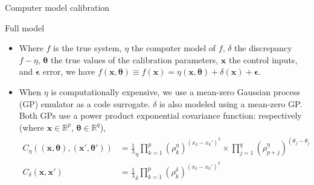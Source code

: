 \documentclass[final]{beamer}
\newlength{\onecolwid}
\begin{document}
\begin{frame}[t]
\begin{columns}[t]
\begin{column}{\onecolwid}
\begin{alertblock}{Computer model calibration}
\begin{itemize}
\end{itemize}

\end{alertblock}


\begin{alertblock}{Full model}

\begin{itemize}

\item Where $f$ is the true system, $\eta$ the computer model of $f$, $\delta$ the discrepancy $f-\eta$, $\boldsymbol \theta$ the true values of the calibration parameters, $\mathbf x$ the control inputs, and $\boldsymbol \epsilon$ error, we have $f(\mathbf x,\boldsymbol \theta) \equiv f(\mathbf x) = \eta(\mathbf x,\boldsymbol \theta) + \delta(\mathbf x) + \boldsymbol \epsilon$.
%
\item When $\eta$ is computationally expensive, we use a mean-zero Gaussian process (GP) emulator as a code surrogate.
%
%
$\delta$ is also modeled using a mean-zero GP. Both GPs use a power product exponential covariance function: respectively (where $\mathbf x\in\mathbb R^p$, $\boldsymbol\theta\in\mathbb R^q$),
\vspace{-3mm}
\begin{align*}
C_\eta(\!(\mathbf x,\!\boldsymbol\theta),\!(\mathbf x'\!,\!\boldsymbol\theta')\!)\! &= \frac1\lambda_\eta \prod_{k=1}^{p}\left(\rho^\eta_k\right)^{\left(x_k -x_k'\right)^2}
\times
\prod_{j=1}^{q}\left( \rho^\eta_{p+j}\right)^{\left(\theta_j-\theta_j'\right)^2},
\\
C_\delta(\mathbf x,\mathbf x') &= \frac1\lambda_\delta \prod_{k=1}^{p}\left(\rho^\delta_k\right)^{\left(x_k -x_k'\right)^2}
\end{align*}


\end{itemize}
\end{alertblock}
\end{column}
\end{columns}
\end{frame}
\end{document}
